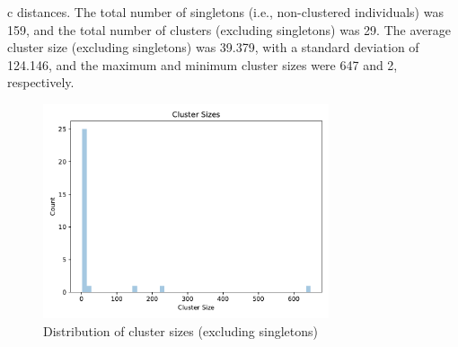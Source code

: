 \documentclass{article}
\begin{document}
c distances. The total number of singletons (i.e., non-clustered individuals) was 159, and the total number of clusters (excluding singletons) was 29. The average cluster size (excluding singletons) was 39.379, with a standard deviation of 124.146, and the maximum and minimum cluster sizes were 647 and 2, respectively.

\begin{figure}[h]
\centering
\includegraphics[width=0.75\textwidth,keepaspectratio]{./figs/cluster_sizes.pdf}
\caption{Distribution of cluster sizes (excluding singletons)}
\end{figure}
\end{document}

